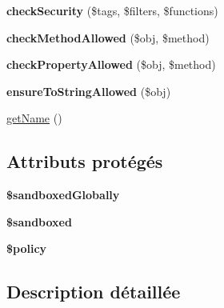 \begin{DoxyCompactItemize}
\item 
{\bfseries check\+Security} (\$tags, \$filters, \$functions)\hypertarget{class_twig___extension___sandbox_a0cc084f6abef1e1ba223ddd057ddcd2b}{}\label{class_twig___extension___sandbox_a0cc084f6abef1e1ba223ddd057ddcd2b}

\item 
{\bfseries check\+Method\+Allowed} (\$obj, \$method)\hypertarget{class_twig___extension___sandbox_a90633d7d23e0b157387b886a8ef87a36}{}\label{class_twig___extension___sandbox_a90633d7d23e0b157387b886a8ef87a36}

\item 
{\bfseries check\+Property\+Allowed} (\$obj, \$method)\hypertarget{class_twig___extension___sandbox_a7dda78b41e8686064b990bb425d24700}{}\label{class_twig___extension___sandbox_a7dda78b41e8686064b990bb425d24700}

\item 
{\bfseries ensure\+To\+String\+Allowed} (\$obj)\hypertarget{class_twig___extension___sandbox_a89a0595de0cbdb8c7fce0816f25a938d}{}\label{class_twig___extension___sandbox_a89a0595de0cbdb8c7fce0816f25a938d}

\item 
\hyperlink{class_twig___extension___sandbox_a3d0963e68bb313b163a73f2803c64600}{get\+Name} ()
\end{DoxyCompactItemize}
\subsection*{Attributs protégés}
\begin{DoxyCompactItemize}
\item 
{\bfseries \$sandboxed\+Globally}\hypertarget{class_twig___extension___sandbox_a3c007b2ec54d8bc03c6f322cb06c967b}{}\label{class_twig___extension___sandbox_a3c007b2ec54d8bc03c6f322cb06c967b}

\item 
{\bfseries \$sandboxed}\hypertarget{class_twig___extension___sandbox_adb14098e4a3a2a64bfa016a599c63537}{}\label{class_twig___extension___sandbox_adb14098e4a3a2a64bfa016a599c63537}

\item 
{\bfseries \$policy}\hypertarget{class_twig___extension___sandbox_aba8290ad8609771225e1a7e2140f6355}{}\label{class_twig___extension___sandbox_aba8290ad8609771225e1a7e2140f6355}

\end{DoxyCompactItemize}


\subsection{Description détaillée}



